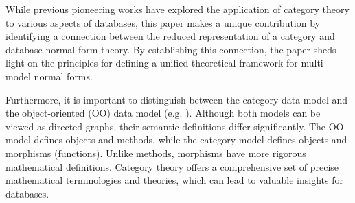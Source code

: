 




While previous pioneering works have explored the application of category theory to various aspects of databases, this paper makes a unique contribution by identifying a connection between the reduced representation of a category and database normal form theory. By establishing this connection, the paper sheds light on the principles for defining a unified theoretical framework for multi-model normal forms. 


    Furthermore, it is important to distinguish between the category data model and the object-oriented (OO) data model (e.g. \cite{10.1145/588011.588026,BEERI1990353}). Although both models can be viewed as directed graphs, their semantic definitions differ significantly. The OO model defines objects and methods, while the category model defines objects and morphisms (functions). Unlike methods, morphisms have more rigorous mathematical definitions. Category theory offers a comprehensive set of precise mathematical terminologies and theories, which can lead to valuable insights for databases.


